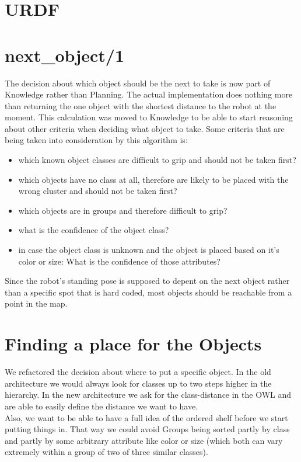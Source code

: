\documentclass[main.tex]{subfiles}
\begin{document}
		\section{URDF}


		\section{next\_object/1}
		The decision about which object should be the next to take is now part of Knowledge rather than Planning. The actual implementation does nothing more than returning the one object with the shortest distance to the robot at the moment. This calculation was moved to Knowledge to be able to start reasoning about other criteria when deciding what object to take. Some criteria that are being taken into consideration by this algorithm is:
		
\begin{itemize}
\item which known object classes are difficult to grip and should not be taken first?
\item which objects have no class at all, therefore are likely to be placed with the wrong cluster and should not be taken first?
\item which objects are in groups and therefore difficult to grip?
\item what is the confidence of the object class?
\item in case the object class is unknown and the object is placed based on it's color or size: What is the confidence of those attributes?
\end{itemize}

Since the robot's standing pose is supposed to depent on the next object rather than a specific spot that is hard coded, most objects should be reachable from a point in the map. 

		\section{Finding a place for the Objects}
		We refactored the decision about where to put a specific object. In the old architecture we would always look for classes up to two steps higher in the hierarchy. In the new architecture we ask for the class-distance in the OWL and are able to easily define the distance we want to have.\\
Also, we want to be able to have a full idea of the ordered shelf before we start putting things in. That way we could avoid Groups being sorted partly by class and partly by some arbitrary attribute like color or size (which both can vary extremely within a group of two of three similar classes). 
\end{document}
